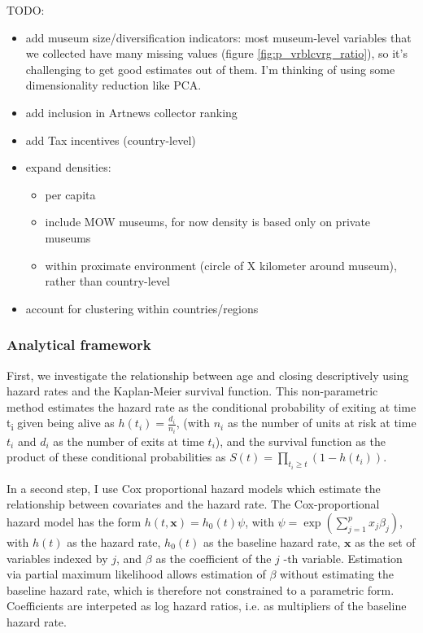 \documentclass[11pt]{article}
\begin{document}
\bigbreak
\noindent
TODO: 
\begin{itemize}
\item add museum size/diversification indicators: most museum-level variables that we collected have many missing values (figure \ref{fig:p_vrblcvrg_ratio}), so it's challenging to get good estimates out of them. I'm thinking of using some dimensionality reduction like PCA.
\item add inclusion in Artnews collector ranking
\item add Tax incentives (country-level)
\item expand densities: 
\begin{itemize}
\item per capita
\item include MOW museums, for now density is based only on private museums
\item within proximate environment (circle of X kilometer around museum), rather than country-level
\end{itemize}
\item account for clustering within countries/regions
\end{itemize}

\subsubsection*{Analytical framework}



First, we investigate the relationship between age and closing descriptively using hazard rates and the Kaplan-Meier survival function.
This non-parametric method estimates the hazard rate as the conditional probability of exiting at time t\textsubscript{i} given being alive as \(h(t_i) = \frac{d_i}{n_i}\), (with \(n_i\) as the number of units at risk at time \(t_i\) and \(d_i\) as the number of exits at time \(t_i\)), and the survival function as the product of these conditional probabilities as \(S(t) = \prod_{t_i \geq t} \left(1-h(t_i) \right)\).



In a second step, I use Cox proportional hazard models which estimate the relationship between covariates and the hazard rate.
The Cox-proportional hazard model has the form \(h(t,\mathbf{x}) = h_0(t) \psi\), with \(\psi = \exp(\sum_{j=1}^p x_j \beta_j)\), with \(h(t)\) as the hazard rate, \(h_0(t)\) as the baseline hazard rate, \(\mathbf{x}\) as the set of variables indexed by \(j\), and \(\beta\) as the coefficient of the \(j\) -th variable.
Estimation via partial maximum likelihood allows estimation of \(\beta\) without estimating the baseline hazard rate, which is therefore not constrained to a parametric form. 
Coefficients are interpeted as log hazard ratios, i.e. as multipliers of the baseline hazard rate. 
\end{document}
